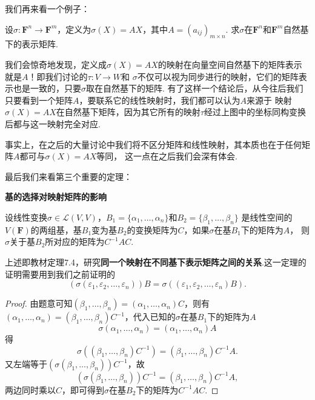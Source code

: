 我们再来看一个例子：
\begin{example}
    设$\sigma:\mathbf{F}^n\to\mathbf{F}^m$，定义为$\sigma(X)=AX$，其中$A=(a_{ij})_{m\times n}$.
    求$\sigma$在$\mathbf{F}^n$和$\mathbf{F}^m$自然基下的表示矩阵.
\end{example}
\begin{solution}

\end{solution}

我们会惊奇地发现，定义成$\sigma(X)=AX$的映射在向量空间自然基下的矩阵表示就是$A$！即我们讨论的$\tau:V\to W$和
$\sigma$不仅可以视为同步进行的映射，它们的矩阵表示也是一致的，只要$\sigma$取在自然基下的矩阵.
有了这样一个结论后，从今往后我们只要看到一个矩阵$A$，要联系它的线性映射时，我们都可以认为$A$来源于
映射$\sigma(X)=AX$在自然基下矩阵，因为其它所有的映射$\tau$经过上图中的坐标同构变换后都与这一映射完全对应.

事实上，在之后的大量讨论中我们将不区分矩阵和线性映射，其本质也在于任何矩阵$A$都可与$\sigma(X)=AX$等同，
这一点在之后我们会深有体会.

最后我们来看第三个重要的定理：
\begin{theorem}\label{thm:11:基的选择对映射矩阵的影响}
    \textbf{\heiti 基的选择对映射矩阵的影响}

    设线性变换$\sigma \in \mathcal{L}(V,V)$，$B_1=\{\alpha_1,\ldots,\alpha_n\}$和$B_2=\{\beta_1,\ldots,\beta_n\}$
    是线性空间的$V(\mathbf{F})$的两组基，基$B_1$变为基$B_2$的变换矩阵为$C$，如果$\sigma$在基$B_1$下的矩阵为$A$，
    则$\sigma$关于基$B_2$所对应的矩阵为$C^{-1}AC$.
\end{theorem}
上述即教材定理7.4，研究\textbf{同一个映射在不同基下表示矩阵之间的关系}.这一定理的证明需要用到我们之前证明的
\[(\sigma(\varepsilon_1,\varepsilon_2,\ldots,\varepsilon_n))B=\sigma((\varepsilon_1,\varepsilon_2,\ldots,\varepsilon_n)B).\]

\begin{proof}
    由题意可知$(\beta_1,\ldots,\beta_n)=(\alpha_1,\ldots,\alpha_n)C$，则有
    $(\alpha_1,\ldots,\alpha_n)=(\beta_1,\ldots,\beta_n)C^{-1}$，代入已知的$\sigma$在基$B_1$下的矩阵为$A$
    \[\sigma(\alpha_1,\ldots,\alpha_n)=(\alpha_1,\ldots,\alpha_n)A\]
    得
    \[\sigma((\beta_1,\ldots,\beta_n)C^{-1})=(\beta_1,\ldots,\beta_n)C^{-1}A.\]
    又左端等于$(\sigma(\beta_1,\ldots,\beta_n))C^{-1}$，故
    \[(\sigma(\beta_1,\ldots,\beta_n))C^{-1}=(\beta_1,\ldots,\beta_n)C^{-1}A,\]
    两边同时乘以$C$，即可得到$\sigma$在基$B_2$下的矩阵为$C^{-1}AC$.
\end{proof}

